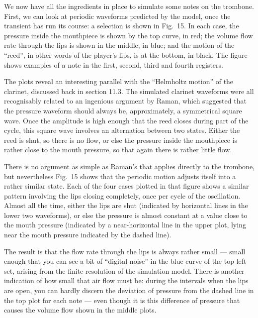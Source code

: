   We now have all the ingredients in place to simulate some notes on the 
  trombone. First, we can look at periodic waveforms predicted by the model, 
  once the transient has run its course: a selection is shown in Fig.\ 15. In 
  each case, the pressure inside the mouthpiece is shown by the top curve, in 
  red; the volume flow rate through the lips is shown in the middle, in blue; 
  and the motion of the “reed”, in other words of the player’s lips, is at the 
  bottom, in black. The figure shows examples of a note in the first, second, 
  third and fourth registers. 

  The plots reveal an interesting parallel with the ``Helmholtz motion'' of the 
  clarinet, discussed back in section 11.3. The simulated clarinet waveforms 
  were all recognisably related to an ingenious argument by Raman, which 
  suggested that the pressure waveform should always be, approximately, a 
  symmetrical square wave. Once the amplitude is high enough that the reed 
  closes during part of the cycle, this square wave involves an alternation 
  between two states. Either the reed is shut, so there is no flow, or else the 
  pressure inside the mouthpiece is rather close to the mouth pressure, so that 
  again there is rather little flow. 

  There is no argument as simple as Raman’s that applies directly to the 
  trombone, but nevertheless Fig.\ 15 shows that the periodic motion adjusts 
  itself into a rather similar state. Each of the four cases plotted in that 
  figure shows a similar pattern involving the lips closing completely, once 
  per cycle of the oscillation. Almost all the time, either the lips are shut 
  (indicated by horizontal lines in the lower two waveforms), or else the 
  pressure is almost constant at a value close to the mouth pressure (indicated 
  by a near-horizontal line in the upper plot, lying near the mouth pressure 
  indicated by the dashed line). 

  The result is that the flow rate through the lips is always rather small — 
  small enough that you can see a bit of “digital noise” in the blue curve of 
  the top left set, arising from the finite resolution of the simulation model. 
  There is another indication of how small that air flow must be: during the 
  intervals when the lips are open, you can hardly discern the deviation of 
  pressure from the dashed line in the top plot for each note --- even though 
  it is this difference of pressure that causes the volume flow shown in the 
  middle plots. 

